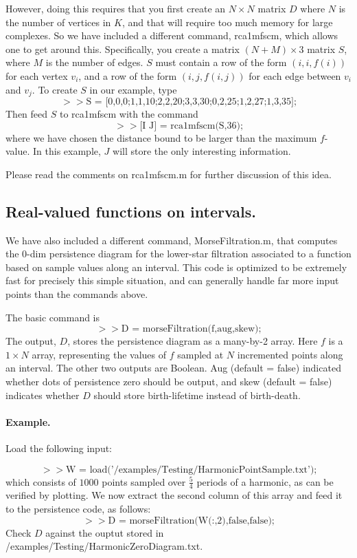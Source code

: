 \documentclass[a4paper,10pt]{article}
\begin{document}
However, doing this requires that you first create an $N \times N$ matrix $D$ where $N$ is the number of vertices in $K$, and
that will require too much memory for large complexes.
So we have included a different command, rca1mfscm, which allows one to get around this.
Specifically, you create a matrix $(N + M) \times 3$ matrix $S$, where $M$ is the number of edges.
$S$ must contain a row of the form $(i,i,f(i))$ for each vertex $v_i$, and a row of the form
$(i,j, f(i,j))$ for each edge between $v_i$ and $v_j$.
To create $S$ in our example, type
$$ >> \mbox{S = [0,0,0;1,1,10;2,2,20;3,3,30;0,2,25;1,2,27;1,3,35];}$$
Then feed $S$ to rca1mfscm with the command
$$ >> \mbox{[I J] = rca1mfscm(S,36);}$$
where we have chosen the distance bound to be larger than the maximum $f$-value.
In this example, $J$ will store the only interesting information.

Please read the comments on rca1mfscm.m for further discussion of this idea.

\subsection{Real-valued functions on intervals.}

We have also included a different command, MorseFiltration.m, that computes the 0-dim persistence diagram for the lower-star filtration
associated to a function based on sample values along an interval.
This code is optimized to be extremely fast for precisely this simple situation, and can generally handle far more input points than the commands above.

The basic command is
$$ >> \mbox{D = morseFiltration(f,aug,skew);}$$
The output, $D$, stores the persistence diagram as a many-by-2 array.
Here $f$ is a $1 \times N$ array, representing the values of $f$ sampled at $N$ incremented points along an interval.
The other two outputs are Boolean. Aug (default = false) indicated whether dots of persistence zero should be output,
and skew (default = false) indicates whether $D$ should store birth-lifetime instead of birth-death.

\paragraph{Example.}

Load the following input:

$$ >> \mbox{W = load('/examples/Testing/HarmonicPointSample.txt');}$$
which consists of $1000$ points sampled over $\frac54$ periods of a harmonic, as can be verified by plotting.
We now extract the second column of this array and feed it to the persistence code, as follows:
$$ >> \mbox{D = morseFiltration(W(:,2),false,false);}$$
Check $D$ against the ouptut stored in /examples/Testing/HarmonicZeroDiagram.txt.
\end{document}
